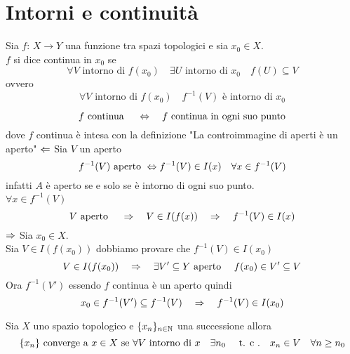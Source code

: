 \section{Intorni e continuit\`a}
\begin{defn}Sia $f:\, X \to Y$ una funzione tra spazi topologici e sia $x_0\in X$.\\
$f$ si dice continua in $x_0$ se 
$$ \forall V \text{ intorno di } f(x_0) \quad \exists U \text{ intorno di } x_0 \quad f(U)\subseteq V$$
ovvero 
$$ \forall V \text{ intorno di } f(x_0) \quad f^{-1} (V) \text{ \`e intorno di } x_0 $$
\end{defn}
\begin{prop}
$$ f\text{ continua } \quad \Leftrightarrow\quad f \text{ continua in ogni suo punto}$$
dove $f$ continua \`e intesa con la definizione "La controimmagine di aperti \`e un aperto"
\proof $\Leftarrow$ Sia $V$ un aperto 
$$ f^{-1}(V)\text{ aperto } \Leftrightarrow f^{-1}(V)\in I(x) \quad \forall x\in f^{-1}(V)$$
infatti $A$ \`e aperto se e solo se \`e intorno di ogni suo punto.\\
$\forall x \in f^{-1}(V)$
$$ V\text{ aperto }  \quad \Rightarrow \quad V\in I(f(x)) \quad \Rightarrow \quad f^{-1}(V) \in I(x)$$
$\Rightarrow$ Sia $x_0\in X$.\\
Sia $V\in I(f(x_0))$ dobbiamo provare che $f^{-1}(V)\in I(x_0)$
$$ V \in I(f(x_0)) \quad \Rightarrow \quad \exists V'\subseteq Y \text{ aperto } \quad f(x_0) \in V'\subseteq V$$
Ora $f^{-1}(V')$ essendo $f$ continua \`e un aperto quindi 
$$ x_0 \in f^{-1}(V') \subseteq f^{-1}(V) \quad \Rightarrow \quad f^{-1}(V) \in I(x_0)$$
\endproof
\end{prop}
\newpage
\begin{defn}Sia $X$ uno spazio topologico e $\displaystyle \{ x_n \}_{n \in \mathbb{N}}$ una successione allora
$$ \{ x_n\} \text{ converge a } x \in X \text{ se } \forall V \text{ intorno di } x \quad \exists n_0 \quad \text{ t. c .} \quad x_n \in V \quad \forall n \geq n_0$$
\end{defn}
